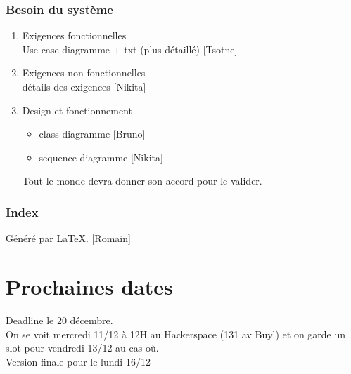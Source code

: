 \documentclass[a4paper,10pt]{article}
\begin{document}
\section{Besoin du système}
\begin{enumerate}
    \item  Exigences fonctionnelles\\
        Use case diagramme + txt (plus détaillé) [Tsotne]
    \item Exigences non fonctionnelles\\
        détails des exigences [Nikita]
    \item Design et fonctionnement
        \begin{itemize}
            \item class diagramme [Bruno]
            \item sequence diagramme [Nikita]
        \end{itemize}
        Tout le monde devra donner son accord pour le valider.
\end{enumerate}
\section{Index}
Généré par \LaTeX. [Romain]
\part*{Prochaines dates}
Deadline le 20 décembre.\\

On se voit mercredi 11/12 à 12H au Hackerspace (131 av Buyl) et on garde un slot pour vendredi 13/12 au cas où.\\

Version finale pour le lundi 16/12
\end{document}
